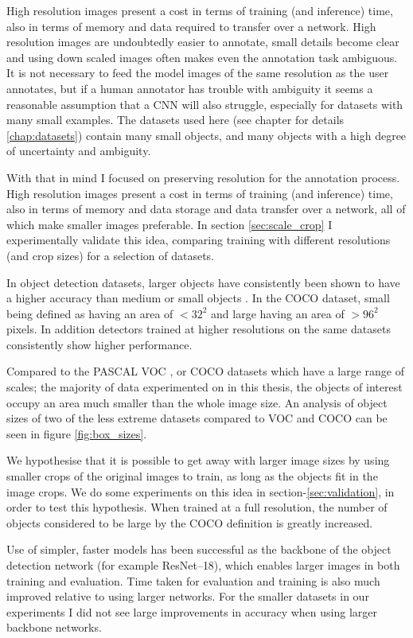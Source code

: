 High resolution images present a cost in terms of training (and inference) time, also in terms of memory and data required to transfer over a network. High resolution images are undoubtedly easier to annotate, small details become clear and using down scaled images often makes even the annotation task ambiguous. It is not necessary to feed the model images of the same resolution as the user annotates, but if a human annotator has trouble with ambiguity it seems a reasonable assumption that a \gls{CNN} will also struggle, especially for datasets with many small examples. The datasets used here (see chapter for details \ref{chap:datasets}) contain many small objects, and many objects with a high degree of uncertainty and ambiguity.

With that in mind I focused on preserving resolution for the annotation process. High resolution images present a cost in terms of training (and inference) time, also in terms of memory and data storage and data transfer over a network, all of which make smaller images preferable. In section \ref{sec:scale_crop} I experimentally validate this idea, comparing training with different resolutions (and crop sizes) for a selection of datasets.

In object detection datasets, larger objects have consistently been shown to have a higher accuracy than medium or small objects \cite{Lin2014, Wang2017, Lin2017a, Law2018, Zhou2019}. In the COCO dataset, small being defined as having an area of $<32^2$ and large having an area of $>96^2$ pixels. In addition detectors trained at higher resolutions on the same datasets consistently show higher performance.

 Compared to the PASCAL VOC \cite{Everingham2008}, or COCO \cite{Lin2014} datasets which have a large range of scales; the majority of data experimented on in this thesis, the objects of interest occupy an area much smaller than the whole image size. An analysis of object sizes of two of the less extreme datasets compared to VOC and COCO can be seen in figure \ref{fig:box_sizes}. 

We hypothesise that it is possible to get away with larger image sizes by using smaller crops of the original images to train, as long as the objects fit in the image crops. We do some experiments on this idea in section-\ref{sec:validation}, in order to test this hypothesis. When trained at a full resolution, the number of objects considered to be large by the COCO definition is greatly increased.

Use of simpler, faster models has been successful as the backbone of the object detection network (for example ResNet--18), which enables larger images in both training and evaluation. Time taken for evaluation and training is also much improved relative to using larger networks. For the smaller datasets in our experiments I did not see large improvements in accuracy when using larger backbone networks.

